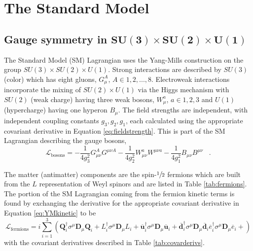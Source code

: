 \section{The Standard Model}
\subsection[Gauge symmetry in $SU(3)\times SU(2)\times U(1)$]
{Gauge symmetry in $\mathbf{SU(3)\times SU(2)\times U(1)}$}
  The Standard Model (SM) Lagrangian uses the
   Yang-Mills construction on the group
   $SU(3)\times SU(2)\times U(1)$.
  Strong interactions are described by $SU(3)$ (color) which
   has eight gluons, $G^A_\mu$, $A\in{1,2,...,8}$.
  Electroweak interactions incorporate the 
   mixing of $SU(2)\times U(1)$ via the
   Higgs mechanism with
   $SU(2)$ (weak charge) having three
   weak bosons, $W_\mu^a$, $a\in{1,2,3}$
   and $U(1)$ (hypercharge) having one
   hyperon $B_\mu$. 
  The field strengths are independent, 
   with independent coupling constants
   $g_3,g_2,g_1$, each  calculated 
   using the appropriate covariant derivative
   in Equation \ref{eq:fieldstrength}.
  This is part of the SM Lagrangian
   describing the gauge bosons,
\begin{equation}\label{eq:smyangmills}
\mathcal{L}_{\mathrm{bosons}} =
 -\frac{1}{4g_3^2}G_{\mu\nu}^A G^{\mu\nu A}
 -\frac{1}{4g_2^2}W_{\mu\nu}^a W^{\mu\nu a}
 -\frac{1}{4g_1^2}B_{\mu\nu}   B^{\mu\nu}
\;\;\;.
\end{equation}

 The matter (antimatter) components
  are the spin-$\sfrac{1}{2}$ fermions which are
  built from the $L$ representation 
  of Weyl spinors %
  and are listed in Table \ref{tab:fermions}.
 The portion of the SM Lagrangian coming from 
  the fermion kinetic terms is found
  by exchanging the derivative for the 
  appropriate covariant derivative in Equation \ref{eq:YMkinetic}
  to be 
\begin{equation}
 \mathcal{L}_{\mathrm{fermions}} = i \sum_{i=1}^3 \left(
  \mathbf{Q}_i^\dagger \sigma^\mu \boldsymbol{D}_\mu \mathbf{Q}_i + 
  L_i^\dagger \sigma^\mu \boldsymbol{D}_\mu L_i + 
  \mathbf{\overline{u}}_i^\dagger \sigma^\mu \boldsymbol{D}_\mu \mathbf{\overline{u}}_i + 
  \mathbf{\overline{d}}_i^\dagger \sigma^\mu \boldsymbol{D}_\mu \mathbf{\overline{d}}_i
  \overline{e}_i^\dagger \sigma^\mu \boldsymbol{D}_\mu \overline{e}_i + 
\right)
\end{equation}
 with the covariant derivatives described in Table \ref{tab:covarderivs}.



